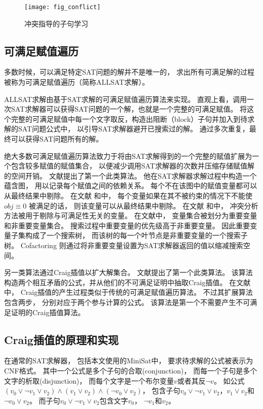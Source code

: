 \begin{figure}[t] %
  \centering
  \texttt{[image: fig\_conflict]}
  \caption{冲突指导的子句学习}
  \label{confict}
\end{figure}


\subsection{可满足赋值遍历}\label{subsec_relallsat}
多数时候，可以满足特定SAT问题的解并不是唯一的，
求出所有可满足解的过程被称为可满足赋值遍历（简称ALLSAT求解）。

ALLSAT求解由基于SAT求解的可满足赋值遍历算法来实现。
直观上看，调用一次SAT求解器可以获得SAT问题的一个解，也就是一个完整的可满足赋值。
将这个完整的可满足赋值中每一个文字取反，构造出阻断（block）子句并加入到待求解的SAT问题公式中，
以引导SAT求解器避开已搜索过的解。
通过多次重复，最终可以获得SAT问题所有的解。

绝大多数可满足赋值遍历算法致力于将由SAT求解得到的一个完整的赋值扩展为一个包含较多赋值的赋值集合，
以便减少调用SAT求解器的次数并压缩存储赋值解的空间开销。
文献提出了第一个此类算法。
他在SAT求解器求解过程中构造一个蕴含图，
用以记录每个赋值之间的依赖关系。
每个不在该图中的赋值变量都可以从最终结果中剔除。
在文献 和中，
每个变量如果在其不被约束的情况下不能使$obj\equiv 0$ 被满足的话，
则该变量可以从最终结果中剔除。
在文献 和中，
冲突分析方法被用于剔除与可满足性无关的变量。
在文献中，
变量集合被划分为重要变量和非重要变量集合。
搜索过程中重要变量的优先级高于非重要变量。
因此重要变量子集构成了一个搜索树，
而该树的每一个叶节点是非重要变量的一个搜索子树。
Cofactoring  则通过将非重要变量设置为SAT求解器返回的值以缩减搜索空间。

另一类算法通过Craig插值以扩大解集合。
文献提出了第一个此类算法。
该算法构造两个相互矛盾的公式，并从他们的不可满足证明中抽取Craig插值。
在文献中，
Craig插值的产生过程类似于传统的可满足赋值遍历算法。
不过其扩展算法包含两步，
分别对应于两个参与计算的公式。
该算法是第一个不需要产生不可满足证明的Craig插值算法。

\subsection{Craig插值的原理和实现}\label{sec_craigimp}
在通常的SAT求解器，
包括本文使用的MiniSat中，
要求待求解的公式被表示为CNF格式。
其中一个公式是多个子句的合取(conjunction)，
而每一个子句是多个文字的析取(disjunction)，
而每个文字是一个布尔变量$v$或者其反$\neg v$。
如公式$(v_0\vee\neg v_1\vee v_2)\wedge(v_1\vee v_2)\wedge(\neg v_0\vee v_2)$，
包含子句$v_0\vee\neg v_1\vee v_2$，$v_1\vee v_2$和$\neg v_0\vee v_2$。
而子句$v_0\vee\neg v_1\vee v_2$包含文字$v_0$， $\neg v_1$和$v_2$。

